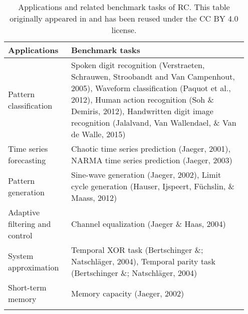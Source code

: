 \begin{table}[!ht]
    \raggedleft
    \caption[Applications and related benchmark tasks of RC.]{
        Applications and related benchmark tasks of RC. This table originally appeared in \citet{tanaka_recent_2019} and has been reused under the CC BY 4.0 license.
    }
    \begin{tabular}{p{0.25\linewidth}  p{0.7\linewidth}}
    \toprule
        \textbf{Applications} & \textbf{Benchmark tasks} \\ 
        \midrule
        Pattern classification & Spoken digit recognition (Verstraeten, Schrauwen, Stroobandt and Van Campenhout, 2005), 
        Waveform classification (Paquot et al., 2012), 
        Human action recognition (Soh \& Demiris, 2012),
        Handwritten digit image recognition (Jalalvand, Van Wallendael, \& Van de Walle, 2015) \\
        \arrayrulecolor{black!10!white}
        \midrule
        Time series forecasting & Chaotic time series prediction (Jaeger, 2001),
        NARMA time series prediction (Jaeger, 2003) \\
        \midrule
        Pattern generation & Sine-wave generation (Jaeger, 2002), 
        Limit cycle generation (Hauser, Ijspeert, Füchslin, \& Maass, 2012) \\
        \midrule
        Adaptive filtering and control & Channel equalization (Jaeger \& Haas, 2004) \\
        \midrule
        System approximation & Temporal XOR task (Bertschinger \&; Natschläger, 2004), 
        Temporal parity task (Bertschinger \&; Natschläger, 2004) \\
        \midrule
        Short-term memory & Memory capacity (Jaeger, 2002) \\
    \arrayrulecolor{black}
    \bottomrule
    \end{tabular}
    \label{table:rc-applications-benchmarks}
\end{table}